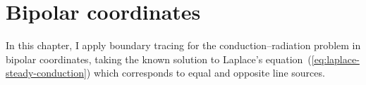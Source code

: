 \chapter{Bipolar coordinates}
\label{ch:bipolar}

In this chapter,
I apply boundary tracing for the conduction--radiation problem
in bipolar coordinates,
taking the known solution
to Laplace's equation~(\ref{eq:laplace-steady-conduction})
which corresponds to equal and opposite line sources.
